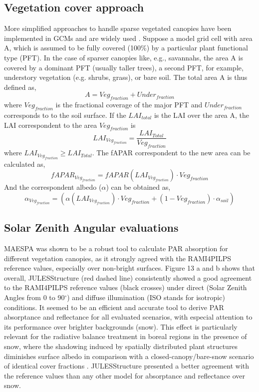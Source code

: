 \subsection{Vegetation cover approach}
More simplified approaches to handle sparse vegetated canopies have been implemented in GCMs and are widely used \citep{Loew2014}. Suppose a model grid cell with area A, which is assumed to be fully covered (100\%) by a particular plant functional type (PFT). In the case of sparser canopies like, e.g., savannahs, the area A is covered by a dominant PFT (usually taller trees), a second PFT, for example, understory vegetation (e.g. shrubs, grass), or bare soil. The total area A is thus defined as,
\begin{equation}
A = Veg_{fraction} + Under_{fraction}
\label{equation:area}
\end{equation}
\noindent where $Veg_{fraction}$ is the fractional coverage of the major PFT and $Under_{fraction}$ corresponds to to the soil surface.  If the $LAI_{total}$ is the LAI over the area A, the LAI correspondent to the area $Veg_{fraction}$ is 
\begin{equation}
LAI_{Veg_{fraction}} = \frac{LAI_{Total}}{Veg_{fraction}}
\label{equation:laivegfraction}
\end{equation}
\noindent where $LAI_{Veg_{fraction}} \geq LAI_{Total}$. The fAPAR correspondent to the new area can be calculated as, 
\begin{equation}
fAPAR_{Veg_{fraction}} = fAPAR(LAI_{Veg_{fraction}})\cdot Veg_{fraction}
\label{equation:faparvegfraction}
\end{equation}
And the correspondent albedo ($\alpha$) can be obtained as, 
\begin{equation}
\alpha_{Veg_{fraction}} = (\alpha(LAI_{Veg_{fraction}}) \cdot Veg_{fraction} + (1 - Veg_{fraction}) \cdot \alpha_{soil})
\label{equation:albedovegfraction}
\end{equation}

\subsection{Solar Zenith Angular evaluations}
MAESPA was shown to be a robust tool to calculate PAR absorption for different vegetation canopies, as it strongly agreed with the RAMI4PILPS reference values, especially over non-bright surfaces. Figure 13 a and b shows that overall, JULESStructure (red dashed line) consistently showed a good agreement to the RAMI4PILPS reference values (black crosses) under direct (Solar Zenith Angles from 0 to 90$^{\circ}$) and diffuse illumination (ISO stands for isotropic) conditions. It seemed to be an efficient and accurate tool to derive PAR absorptance and reflectance for all evaluated scenarios, with especial attention to its performance over brighter backgrounds (snow). This effect is particularly relevant for the radiative balance treatment in boreal regions in the presence of snow, where the shadowing induced by spatially distributed plant structures diminishes surface albedo in comparison with a closed-canopy/bare-snow scenario of identical cover fractions \citep{Viterbo1999}. JULESStructure presented a better agreement with the reference values than any other model for absorptance and reflectance over snow. 

